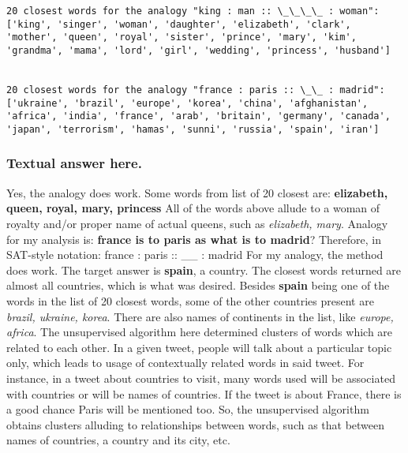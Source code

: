 \documentclass[11pt]{article}
\begin{document}
    \begin{Verbatim}[commandchars=\\\{\}]
20 closest words for the analogy "king : man :: \_\_\_\_ : woman":  
['king', 'singer', 'woman', 'daughter', 'elizabeth', 'clark', 'mother', 'queen', 'royal', 'sister', 'prince', 'mary', 'kim', 'grandma', 'mama', 'lord', 'girl', 'wedding', 'princess', 'husband'] 


20 closest words for the analogy "france : paris :: \_\_ : madrid":  
['ukraine', 'brazil', 'europe', 'korea', 'china', 'afghanistan', 'africa', 'india', 'france', 'arab', 'britain', 'germany', 'canada', 'japan', 'terrorism', 'hamas', 'sunni', 'russia', 'spain', 'iran']

    \end{Verbatim}

    \subsubsection{Textual answer here.}\label{textual-answer-here.}

    Yes, the analogy does work. Some words from list of 20 closest are:
\textbf{elizabeth, queen, royal, mary, princess} All of the words above
allude to a woman of royalty and/or proper name of actual queens, such
as \emph{elizabeth, mary}. Analogy for my analysis is: \textbf{france is
to paris as what is to madrid}? Therefore, in SAT-style notation: france
: paris :: \_\_ : madrid For my analogy, the method does work. The
target answer is \textbf{spain}, a country. The closest words returned
are almost all countries, which is what was desired. Besides
\textbf{spain} being one of the words in the list of 20 closest words,
some of the other countries present are \emph{brazil, ukraine, korea}.
There are also names of continents in the list, like \emph{europe,
africa}. The unsupervised algorithm here determined clusters of words
which are related to each other. In a given tweet, people will talk
about a particular topic only, which leads to usage of contextually
related words in said tweet. For instance, in a tweet about countries to
visit, many words used will be associated with countries or will be
names of countries. If the tweet is about France, there is a good chance
Paris will be mentioned too. So, the unsupervised algorithm obtains
clusters alluding to relationships between words, such as that between
names of countries, a country and its city, etc.


    
    
    
    
\end{document}
